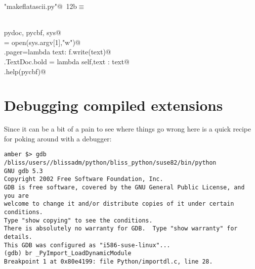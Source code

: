 \documentclass[10pt,a4paper,twoside,notitlepage]{article}
\begin{document}
\begin{flushleft} \small
\begin{minipage}{\linewidth}\label{scrap12}\raggedright\small
{} \verb@"makeflatascii.py"@\nobreak\ {\footnotesize {12b}}$\equiv$
\vspace{-1ex}
\begin{list}{}{} \item
\mbox{}\verb@@\\
\mbox{}\verb@import pydoc, pycbf, sys@\\
\mbox{}\verb@f = open(sys.argv[1],"w")@\\
\mbox{}\verb@pydoc.pager=lambda text: f.write(text)@\\
\mbox{}\verb@pydoc.TextDoc.bold = lambda self,text : text@\\
\mbox{}\verb@pydoc.help(pycbf)@\\
\mbox{}\verb@@{\NWsep}
\end{list}
\vspace{-1.5ex}
\footnotesize
\begin{list}{}{\setlength{\itemsep}{-\parsep}\setlength{\itemindent}{-\leftmargin}}

\item{}
\end{list}
\end{minipage}\vspace{4ex}
\end{flushleft}
\section{Debugging compiled extensions}

Since it can be a bit of a pain to see where things go wrong here is a
quick recipe for poking around with a debugger:

\begin{verbatim}
amber $> gdb /bliss/users//blissadm/python/bliss_python/suse82/bin/python
GNU gdb 5.3
Copyright 2002 Free Software Foundation, Inc.
GDB is free software, covered by the GNU General Public License, and you are
welcome to change it and/or distribute copies of it under certain conditions.
Type "show copying" to see the conditions.
There is absolutely no warranty for GDB.  Type "show warranty" for details.
This GDB was configured as "i586-suse-linux"...
(gdb) br _PyImport_LoadDynamicModule
Breakpoint 1 at 0x80e4199: file Python/importdl.c, line 28.
\end{verbatim}
\end{document}
